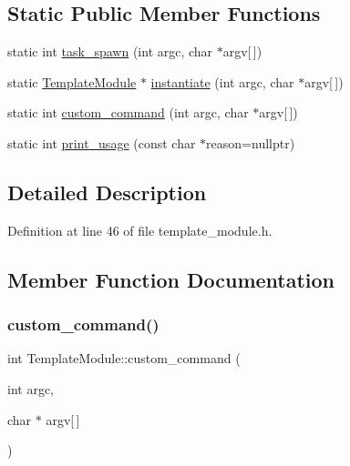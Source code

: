 \subsection*{Static Public Member Functions}
\begin{DoxyCompactItemize}
\item 
static int \hyperlink{classTemplateModule_a442b58c36fd9a84d34c6c2ca5da30500}{task\+\_\+spawn} (int argc, char $\ast$argv\mbox{[}$\,$\mbox{]})
\item 
static \hyperlink{classTemplateModule}{Template\+Module} $\ast$ \hyperlink{classTemplateModule_aa31cbf48b351f5ee0b33b3cbd5b8e536}{instantiate} (int argc, char $\ast$argv\mbox{[}$\,$\mbox{]})
\item 
static int \hyperlink{classTemplateModule_aa8b46132f5dcab9299e34ff43e2d6db5}{custom\+\_\+command} (int argc, char $\ast$argv\mbox{[}$\,$\mbox{]})
\item 
static int \hyperlink{classTemplateModule_a5ce5da37ebb624d8fbf301343d0ed341}{print\+\_\+usage} (const char $\ast$reason=nullptr)
\end{DoxyCompactItemize}


\subsection{Detailed Description}


Definition at line 46 of file template\+\_\+module.\+h.



\subsection{Member Function Documentation}
\mbox{\label{classTemplateModule_aa8b46132f5dcab9299e34ff43e2d6db5}} 
\subsubsection{\texorpdfstring{custom\+\_\+command()}{custom\_command()}}
{\footnotesize\ttfamily int Template\+Module\+::custom\+\_\+command (\begin{DoxyParamCaption}\item[{int}]{argc,  }\item[{char $\ast$}]{argv\mbox{[}$\,$\mbox{]} }\end{DoxyParamCaption})\hspace{0.3cm}{\ttfamily [static]}}

